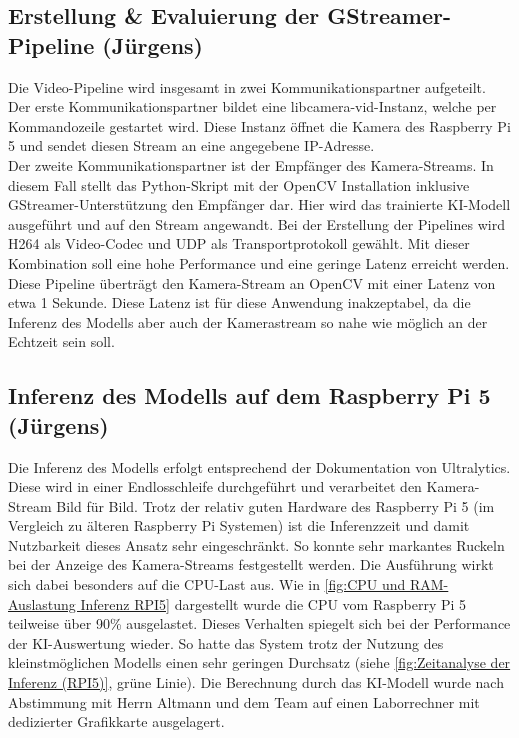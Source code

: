 \subsection{Erstellung \& Evaluierung der GStreamer-Pipeline (Jürgens)}
Die Video-Pipeline wird insgesamt in zwei Kommunikationspartner aufgeteilt. Der erste Kommunikationspartner bildet eine libcamera-vid-Instanz, welche per Kommandozeile gestartet wird. Diese Instanz öffnet die Kamera des Raspberry Pi 5 und sendet diesen Stream an eine angegebene IP-Adresse. \\
Der zweite Kommunikationspartner ist der Empfänger des Kamera-Streams. In diesem Fall stellt das Python-Skript mit der OpenCV Installation inklusive GStreamer-Unterstützung den Empfänger dar. Hier wird das trainierte KI-Modell ausgeführt und auf den Stream angewandt.
Bei der Erstellung der Pipelines wird H264 als Video-Codec und UDP als Transportprotokoll gewählt. Mit dieser Kombination soll eine hohe Performance und eine geringe Latenz erreicht werden.\\
Diese Pipeline überträgt den Kamera-Stream an OpenCV mit einer Latenz von etwa 1 Sekunde. Diese Latenz ist für diese Anwendung inakzeptabel, da die Inferenz des Modells aber auch der Kamerastream so nahe wie möglich an der Echtzeit sein soll. 

\subsection{Inferenz des Modells auf dem Raspberry Pi 5 (Jürgens) \label{sec:inference_raspberry}}
Die Inferenz des Modells erfolgt entsprechend der Dokumentation von Ultralytics. Diese wird in einer Endlosschleife durchgeführt und verarbeitet den Kamera-Stream Bild für Bild. Trotz der relativ guten Hardware des Raspberry Pi 5 (im Vergleich zu älteren Raspberry Pi Systemen) ist die Inferenzzeit und damit Nutzbarkeit dieses Ansatz sehr eingeschränkt. So konnte sehr markantes Ruckeln bei der Anzeige des Kamera-Streams festgestellt werden. Die Ausführung wirkt sich dabei besonders auf die CPU-Last aus. Wie in \ref{fig:CPU und RAM-Auslastung Inferenz RPI5} dargestellt wurde die CPU vom Raspberry Pi 5 teilweise über 90\% ausgelastet. Dieses Verhalten spiegelt sich bei der Performance der KI-Auswertung wieder. So hatte das System trotz der Nutzung des kleinstmöglichen Modells einen sehr geringen Durchsatz (siehe \ref{fig:Zeitanalyse der Inferenz (RPI5)}, grüne Linie). Die Berechnung durch das KI-Modell wurde nach Abstimmung mit Herrn Altmann und dem Team auf einen Laborrechner mit dedizierter Grafikkarte ausgelagert.

